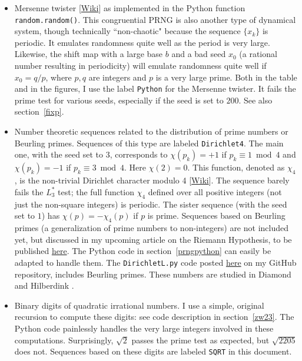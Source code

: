 \documentclass[oneside,10pt]{book}
\begin{document}
\begin{itemize}
\item \textcolor{index}{Mersenne twister} [\href{https://en.wikipedia.org/wiki/Mersenne_Twister}{Wiki}] as
 implemented in the Python function \texttt{random.random()}. This congruential PRNG is also another type of dynamical system,
 though technically ``non-chaotic" because the sequence $\{x_k\}$
is periodic. It emulates randomness quite well as the period is very large.
 Likewise, the shift map with a large base $b$ and a bad seed $x_0$ (a rational number resulting in periodicity) will emulate
 randomness quite well if $x_0=q/p$, where $p,q$ are integers and $p$ is a very large prime. Both in the table and in the figures, I use the label \texttt{Python} for the Mersenne twister. It fails the prime test for various seeds, especially if the seed is set to $200$. See also section~\ref{fixp}.
\item Number theoretic sequences related to the distribution of prime numbers or
 \textcolor{index}{Beurling primes}. Sequences of this type are labeled \texttt{Dirichlet4}. The main one, with the seed set to $3$, corresponds to
 $\chi(p_k)=+1$ if $p_k \equiv 1 \bmod 4$ and $\chi(p_k)=-1$ if $p_k \equiv 3\bmod 4$. Here $\chi(2)=0$. This function, denoted as $\chi_4$, is the non-trivial \textcolor{index}{Dirichlet character modulo 4} [\href{https://en.wikipedia.org/wiki/Dirichlet_character}{Wiki}]. The sequence barely fails the $L^*_3$ test; the full function $\chi_4$ defined over all positive integers (not just the non-square integers) is periodic. The sister sequence (with the seed set to $1$) has
 $\chi(p)=-\chi_4(p)$ if $p$ is prime. Sequences based on Beurling primes (a generalization of prime numbers to non-integers) are not included yet, but discussed in my upcoming article on the Riemann Hypothesis, to be published \href{https://mltechniques.com/resources/}{here}. The Python code
in section~\ref{prngpython} can easily be adapted to handle them. The \texttt{DirichletL.py} code posted
 \href{https://github.com/VincentGranville/Experimental-Math-Number-Theory/blob/main/Source-Code/dirichletL.py}{here} on my GitHub repository, includes Beurling primes.  These numbers are studied in
 Diamond \cite{wen2016} and Hilberdink  \cite{bzf2004}.
\item Binary digits of \textcolor{index}{quadratic irrational} numbers. I use a simple, original recursion to compute these
digits: see code description in section~\ref{zw23}. The Python code painlessly handles the very large integers involved in these computations. Surprisingly, $\sqrt{2}$ passes the prime test as expected, but $\sqrt{2205}$ does not. Sequences based on these digits are labeled \texttt{SQRT} in this document.
\end{itemize}
\end{document}
